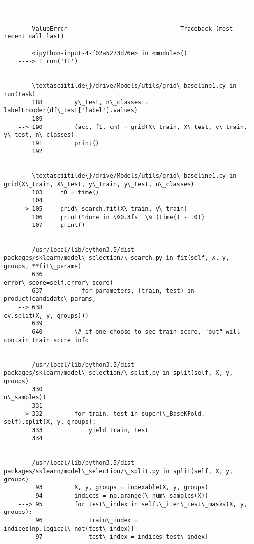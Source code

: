 \documentclass[11pt]{article}
\begin{document}
    \begin{Verbatim}[commandchars=\\\{\}]

        ---------------------------------------------------------------------------

        ValueError                                Traceback (most recent call last)

        <ipython-input-4-f02a5273d76e> in <module>()
    ----> 1 run('TI')
    

        \textasciitilde{}/drive/Models/utils/grid\_baseline1.py in run(task)
        188         y\_test, n\_classes = labelEncoder(df\_test['label'].values)
        189 
    --> 190         (acc, f1, cm) = grid(X\_train, X\_test, y\_train, y\_test, n\_classes)
        191         print()
        192 


        \textasciitilde{}/drive/Models/utils/grid\_baseline1.py in grid(X\_train, X\_test, y\_train, y\_test, n\_classes)
        103     t0 = time()
        104 
    --> 105     grid\_search.fit(X\_train, y\_train)
        106     print("done in \%0.3fs" \% (time() - t0))
        107     print()


        /usr/local/lib/python3.5/dist-packages/sklearn/model\_selection/\_search.py in fit(self, X, y, groups, **fit\_params)
        636                                   error\_score=self.error\_score)
        637           for parameters, (train, test) in product(candidate\_params,
    --> 638                                                    cv.split(X, y, groups)))
        639 
        640         \# if one choose to see train score, "out" will contain train score info


        /usr/local/lib/python3.5/dist-packages/sklearn/model\_selection/\_split.py in split(self, X, y, groups)
        330                                                              n\_samples))
        331 
    --> 332         for train, test in super(\_BaseKFold, self).split(X, y, groups):
        333             yield train, test
        334 


        /usr/local/lib/python3.5/dist-packages/sklearn/model\_selection/\_split.py in split(self, X, y, groups)
         93         X, y, groups = indexable(X, y, groups)
         94         indices = np.arange(\_num\_samples(X))
    ---> 95         for test\_index in self.\_iter\_test\_masks(X, y, groups):
         96             train\_index = indices[np.logical\_not(test\_index)]
         97             test\_index = indices[test\_index]



\end{Verbatim}
\end{document}
